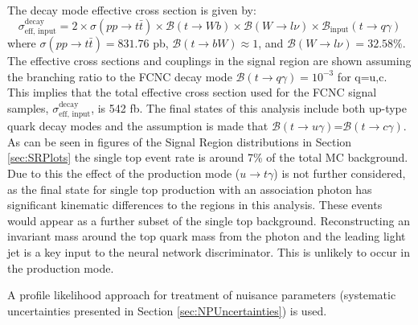 The decay mode effective cross section is given by:
\[\sigma_\text{eff, input}^\text{decay} = 2\times \sigma(pp\rightarrow t\bar{t}) \times \mathcal{B}(t\rightarrow Wb) \times \mathcal{B}(W\rightarrow l \nu)\times \mathcal{B}_\text{input}(t \rightarrow q \gamma)
\]
where $\sigma(pp\rightarrow t\bar{t}) =831.76$ pb, $\mathcal{B}(t\rightarrow bW) \approx1$, and $\mathcal{B}(W\rightarrow l \nu) =32.58\%$.  The effective cross sections and couplings in the signal region are shown assuming the branching ratio to the FCNC decay mode $\mathcal{B}(t\rightarrow q \gamma) = 10^{-3}$ for q=u,c.  This implies that the total effective cross section used for the FCNC signal samples, $\sigma_\text{eff, input}^\text{decay}$, is 542 fb.  The final states of this analysis include both up-type quark decay modes and the assumption is made that $\mathcal{B}(t\rightarrow u\gamma)$=$\mathcal{B}(t\rightarrow c\gamma)$.  As can be seen in figures of the Signal Region distributions in Section \ref{sec:SRPlots} the single top event rate is around 7\% of the total MC background.  Due to this the effect of the production mode ($u\rightarrow t\gamma$) is not further considered, as the final state for single top production with an association photon has significant kinematic differences to the regions in this analysis.  These events would appear as a further subset of the single top background.  Reconstructing an invariant mass around the top quark mass from the photon and the leading light jet is a key input to the neural network discriminator.  This is unlikely to occur in the production mode.

A profile likelihood approach for treatment of nuisance parameters\cite{Cowan:2010js} (systematic uncertainties presented in Section \ref{sec:NPUncertainties}) is used.

